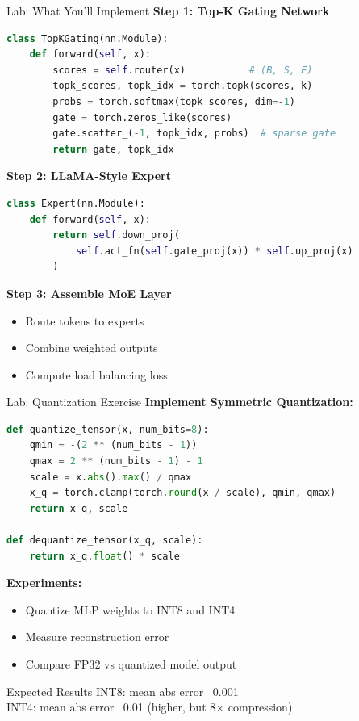 \documentclass[aspectratio=169,10pt]{beamer}
\begin{document}
\begin{frame}[fragile]{Lab: What You'll Implement}
    \textbf{Step 1: Top-K Gating Network}
    \begin{lstlisting}[language=Python]
class TopKGating(nn.Module):
    def forward(self, x):
        scores = self.router(x)           # (B, S, E)
        topk_scores, topk_idx = torch.topk(scores, k)
        probs = torch.softmax(topk_scores, dim=-1)
        gate = torch.zeros_like(scores)
        gate.scatter_(-1, topk_idx, probs)  # sparse gate
        return gate, topk_idx
    \end{lstlisting}

    \vspace{0.1cm}
    \textbf{Step 2: LLaMA-Style Expert}
    \begin{lstlisting}[language=Python]
class Expert(nn.Module):
    def forward(self, x):
        return self.down_proj(
            self.act_fn(self.gate_proj(x)) * self.up_proj(x)
        )
    \end{lstlisting}

    \vspace{0.1cm}
    \textbf{Step 3: Assemble MoE Layer}
    \begin{itemize}
        \item Route tokens to experts
        \item Combine weighted outputs
        \item Compute load balancing loss
    \end{itemize}
\end{frame}

\begin{frame}[fragile]{Lab: Quantization Exercise}
    \textbf{Implement Symmetric Quantization:}
    \begin{lstlisting}[language=Python]
def quantize_tensor(x, num_bits=8):
    qmin = -(2 ** (num_bits - 1))
    qmax = 2 ** (num_bits - 1) - 1
    scale = x.abs().max() / qmax
    x_q = torch.clamp(torch.round(x / scale), qmin, qmax)
    return x_q, scale

def dequantize_tensor(x_q, scale):
    return x_q.float() * scale
    \end{lstlisting}


    \textbf{Experiments:}
    \begin{itemize}
        \item Quantize MLP weights to INT8 and INT4
        \item Measure reconstruction error
        \item Compare FP32 vs quantized model output
    \end{itemize}


    \begin{block}{Expected Results}
        INT8: mean abs error ~0.001 \\
        INT4: mean abs error ~0.01 (higher, but 8$\times$ compression)
    \end{block}
\end{frame}
\end{document}
